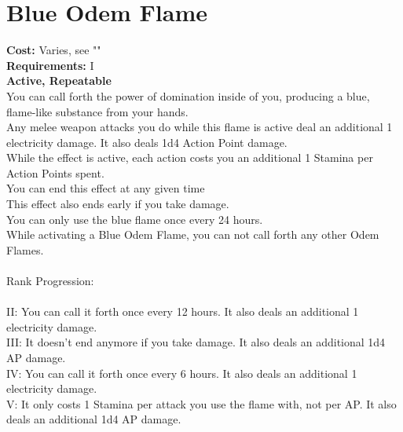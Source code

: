 \section{Blue Odem Flame}\label{perk:blueOdemFlame}
\textbf{Cost:} Varies, see ""\\
\textbf{Requirements:} I\\
\textbf{Active, Repeatable}\\
You can call forth the power of domination inside of you, producing a blue, flame-like substance from your hands.\\
Any melee weapon attacks you do while this flame is active deal an additional 1 electricity damage.
It also deals 1d4 Action Point damage.\\
While the effect is active, each action costs you an additional 1 Stamina per Action Points spent.\\
You can end this effect at any given time\\
This effect also ends early if you take damage.\\
You can only use the blue flame once every 24 hours.\\
While activating a Blue Odem Flame, you can not call forth any other Odem Flames.\\
\\
Rank Progression:\\
\\
II: You can call it forth once every 12 hours.
It also deals an additional 1 electricity damage.\\
III: It doesn't end anymore if you take damage.
It also deals an additional 1d4 AP damage.\\
IV: You can call it forth once every 6 hours.
It also deals an additional 1 electricity damage.\\
V: It only costs 1 Stamina per attack you use the flame with, not per AP.
It also deals an additional 1d4 AP damage.\\